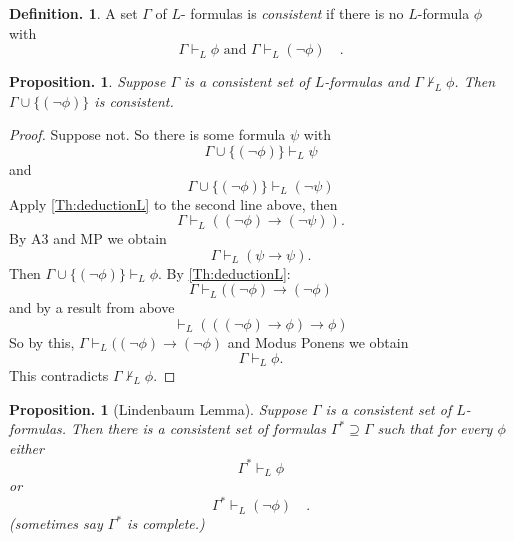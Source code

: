 \documentclass[a4paper,oneside,11pt,DIV=12,parskip=half]{scrartcl}
\theoremstyle{plain}
\newtheorem{proposition}[theorem]{Proposition.}
\theoremstyle{definition}
\newtheorem{definition}[theorem]{Definition.}
\newtheorem{remark, definition}[theorem]{Remark and Definition.}
\newtheorem{lemma, definition}[theorem]{Lemma and Definition.}
\newtheorem{theorem, definition}[theorem]{Theorem and Definition.}
\theoremstyle{remark}
\newtheorem*{remark, example}{\textbf{Remark and Exercise}}
\begin{document}
\begin{definition}
A set $\Gamma$ of $L$- formulas is \emph{consistent} if there is no $L$-formula $\phi$ with
    \[\Gamma \vdash_L \phi \text{ and } \Gamma \vdash_L (\lnot \phi) \quad . \]
\end{definition}

\begin{proposition}\label{TH:extension}
Suppose $\Gamma$ is a consistent set of $L$-formulas and $\Gamma \not \vdash_L \phi$. Then $\Gamma \cup \{(\lnot \phi)\}$ is consistent.
\end{proposition}
\begin{proof}
Suppose not. So there is some formula $\psi$ with
\[ \Gamma \cup \{(\lnot \phi) \} \vdash_L \psi \] and
\[ \Gamma \cup \{(\lnot \phi) \} \vdash_L (\lnot \psi) \]
Apply \ref{Th:deductionL} to the second line above, then
\[ \Gamma \vdash_L ((\lnot \phi) \rightarrow (\lnot \psi)). \]
By A3 and MP we obtain
\[ \Gamma \vdash_L (\psi \rightarrow \psi). \]
Then $\Gamma \cup \{(\lnot \phi) \} \vdash_L \phi$. By \ref{Th:deductionL}: 
\[ \Gamma \vdash_L ((\lnot \phi) \rightarrow (\lnot \phi)  \]
and by a result from above
    \[ \vdash_L (((\lnot \phi) \rightarrow \phi) \rightarrow \phi) \]
So by this, $ \Gamma \vdash_L ((\lnot \phi) \rightarrow (\lnot \phi)$   and Modus Ponens we obtain
\[ \Gamma \vdash_L \phi. \]
This contradicts $\Gamma \not \vdash_L \phi$.
\end{proof}

\begin{proposition}[Lindenbaum Lemma]
Suppose $\Gamma$ is a consistent set of $L$-formulas. Then there is a consistent set of formulas
$ \Gamma^* \supseteq \Gamma$ such that for every $\phi$ either
    \[\Gamma^* \vdash_L \phi \] or
    \[\Gamma^* \vdash_L (\lnot \phi) \quad . \]
    (sometimes say $\Gamma^*$ is \emph{complete}.) 
\end{proposition}
\end{document}
